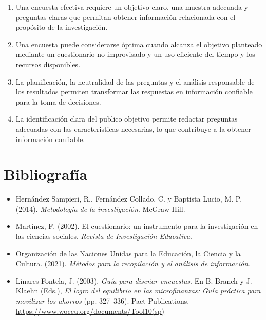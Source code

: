\documentclass[12pt]{article}
\begin{document}
	\begin{enumerate}
		
		\item Una encuesta efectiva requiere un objetivo claro, una muestra adecuada y preguntas claras que permitan obtener información relacionada con el propósito de la investigación.
		
		\item Una encuesta puede considerarse óptima cuando alcanza el objetivo planteado mediante un cuestionario no improvisado y un uso eficiente del tiempo y los recursos disponibles.
		
		\item La planificación, la neutralidad de las preguntas y el análisis
		responsable de los resultados permiten transformar las respuestas en
		información confiable para la toma de decisiones.
		
		\item La identificación clara del publico objetivo permite redactar preguntas adecuadas con las caracteristicas necesarias, lo que contribuye a la obtener información confiable.
		
	\end{enumerate}
	
	\section*{Bibliografía}
	
	\begin{itemize}[leftmargin=0cm, label={}]
		
		\item Hernández Sampieri, R., Fernández Collado, C. y Baptista
		Lucio, M. P. (2014). \textit{Metodología de la investigación}.
		McGraw-Hill.
		
		\item Martínez, F. (2002). El cuestionario: un instrumento para la
		investigación en las ciencias sociales.
		\textit{Revista de Investigación Educativa}.
		
		\item Organización de las Naciones Unidas para la Educación, la
		Ciencia y la Cultura. (2021). \textit{Métodos para la recopilación
			y el análisis de información}.
		\item Linares Fontela, J. (2003).
		\textit{Guía para diseñar encuestas}.
		En B. Branch y J. Klaehn (Eds.),
		\textit{El logro del equilibrio en las microfinanzas:
			Guía práctica para movilizar los ahorros}
		(pp. 327--336). Pact Publications.
		\url{https://www.woccu.org/documents/Tool10(sp)}
		
	\end{itemize}
	
\end{document}
